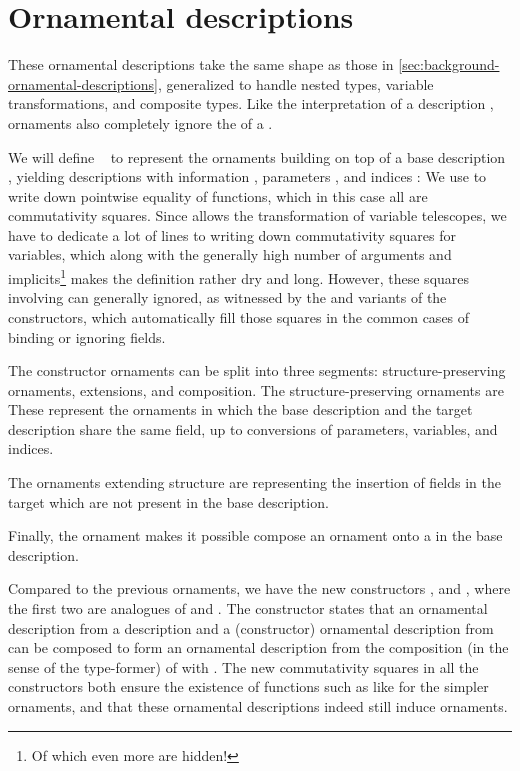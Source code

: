 \section{Ornamental descriptions}
These ornamental descriptions take the same shape as those in \autoref{sec:background-ornamental-descriptions}, generalized to handle nested types, variable transformations, and composite types. Like the interpretation of a description , ornaments also completely ignore the  of a .

We will define \  to represent the ornaments building on top of a base description , yielding descriptions with information , parameters , and indices :
We use  to write down pointwise equality of functions, which in this case all are commutativity squares. Since  allows the transformation of variable telescopes, we have to dedicate a lot of lines to writing down commutativity squares for variables, which along with the generally high number of arguments and implicits\footnote{Of which even more are hidden!} makes the definition rather dry and long. However, these squares involving  can generally ignored, as witnessed by the  and  variants of the constructors, which automatically fill those squares in the common cases of binding or ignoring fields.

The constructor ornaments can be split into three segments: structure-preserving ornaments, extensions, and composition. The structure-preserving ornaments are
These represent the ornaments in which the base description and the target description share the same field, up to conversions of parameters, variables, and indices.

The ornaments extending structure are
representing the insertion of fields in the target which are not present in the base description.

Finally, the ornament
makes it possible compose an ornament onto a  in the base description.

Compared to the previous ornaments, we have the new constructors ,  and , where the first two are analogues of  and . The  constructor states that an ornamental description from a description  and a (constructor) ornamental description from  can be composed to form an ornamental description from the composition (in the sense of the  type-former) of  with . The new commutativity squares in all the constructors both ensure the existence of functions such as 
like for the simpler ornaments, and that these ornamental descriptions indeed still induce ornaments.

